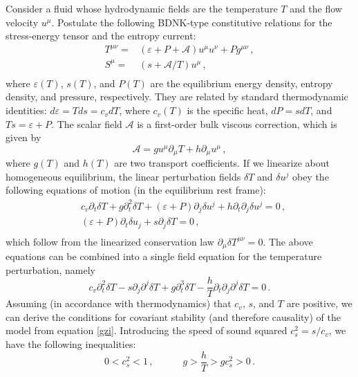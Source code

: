 \documentclass[a4paper, amsfonts, amssymb, amsmath, reprint, showkeys, nofootinbib, twoside,notitlepage,onecolumn,preprintnumbers]{revtex4-2}
\newcommand{\spc}{\quad \quad \quad}
\theoremstyle{definition}
\theoremstyle{theorem}
\theoremstyle{corollary}
\begin{document}
Consider a fluid whose hydrodynamic fields are the temperature $T$ and the flow velocity $u^\mu$. Postulate the following BDNK-type \cite{Bemfica2017TheFirst,GavassinoSymmetric2022,Noronha:2021syv,Bemfica:2022dnk} constitutive relations for the stress-energy tensor and the entropy current:
\begin{equation}
\begin{split}
T^{\mu \nu}={}& (\varepsilon+P+\mathcal{A})u^\mu u^\nu +Pg^{\mu \nu} \, , \\
S^\mu ={}& (s+\mathcal{A}/T)u^\mu \, , \\
\end{split}
\end{equation}
where $\varepsilon(T)$, $s(T)$, and $P(T)$ are the equilibrium energy density, entropy density, and pressure, respectively. They are related by standard thermodynamic identities: $d\varepsilon =Tds=c_v dT$, where $c_v(T)$ is the specific heat, $dP=sdT$, and $Ts= \varepsilon+P$. The scalar field $\mathcal{A}$ is a first-order bulk viscous correction, which is given by
\begin{equation}\label{zimared}
\mathcal{A}=g u^\mu \partial_\mu T + h \partial_\mu u^\mu \, ,
\end{equation}
where $g(T)$ and $h(T)$ are two transport coefficients. If we linearize about homogeneous equilibrium, the linear perturbation fields $\delta T$ and $\delta u^j$ obey the following equations of motion (in the equilibrium rest frame):
\begin{equation}\label{zimablue}
\begin{split}
& c_v \partial_t \delta T +g \partial^2_t \delta T +(\varepsilon{+}P)\partial_j \delta u^j + h\partial_t \partial_j \delta u^j =0 \, , \\
& (\varepsilon{+}P)\partial_t \delta u_j + s \partial_j \delta T =0 \, , \\
\end{split}
\end{equation}
which follow from the linearized conservation law $\partial_\mu \delta T^{\mu \nu}=0$. The above equations can be combined into a single field equation for the temperature perturbation, namely
\begin{equation}\label{gzi}
c_v \partial^2_t \delta T -s \partial_j \partial^j \delta T + g \partial^3_t \delta T -\dfrac{h}{T} \partial_t \partial_j \partial^j \delta T=0 \, .
\end{equation}
Assuming (in accordance with thermodynamics) that $c_v$, $s$, and $T$ are positive, we can derive the conditions for covariant stability (and therefore causality) of the model from equation \eqref{gzi}. Introducing the speed of sound squared $c_s^2=s/c_v$, we have the following inequalities:
\begin{equation}\label{mustuzzo}
0< c_s^2 <1 \, , \spc g > \dfrac{h}{T} > gc_s^2 >0 \, .
\end{equation}
\end{document}
